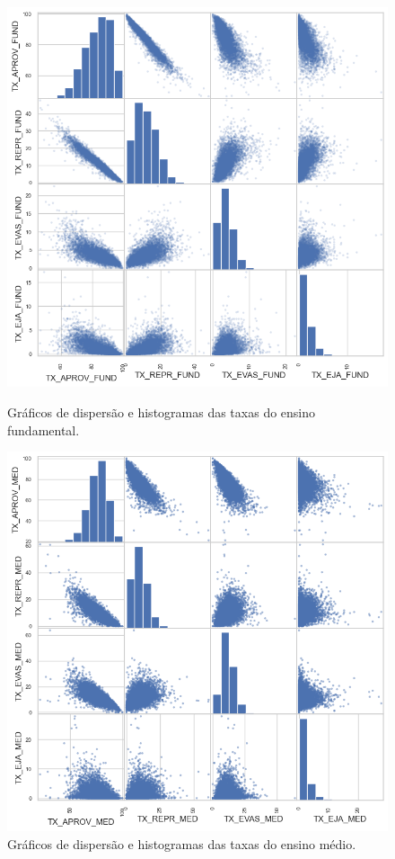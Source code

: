 \begin{figure}[H]
    \centering
    \begin{minipage}{0.45\textwidth}
        \centering
        \includegraphics[scale=0.35]{Graphics/ScatterFundamental.png}
        \caption{Gráficos de dispersão e histogramas das taxas do ensino fundamental.}
        \label{fig:fundamental}
    \end{minipage}\hfill
    \begin{minipage}{0.45\textwidth}
        \centering
        \includegraphics[scale=0.35]{Graphics/ScatterMedio.png}
        \caption{Gráficos de dispersão e histogramas das taxas do ensino médio.}
        \label{fig:medio}
    \end{minipage}
\end{figure}

